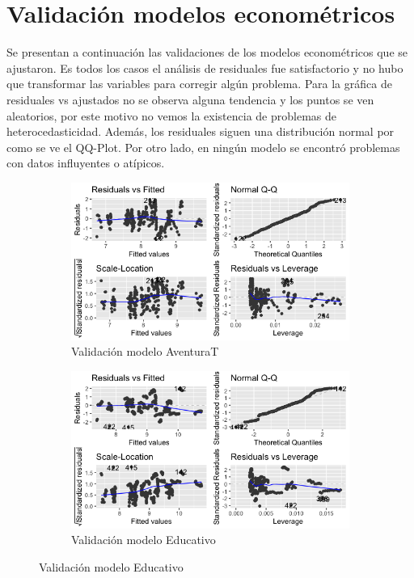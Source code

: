 \chapter{Validación modelos econométricos}

Se presentan a continuación las validaciones de los modelos econométricos que se ajustaron. Es todos los casos el análisis de residuales fue satisfactorio y no hubo que transformar las variables para corregir algún problema. Para la gráfica de residuales vs ajustados no se observa alguna tendencia y los puntos se ven aleatorios, por este motivo no vemos la existencia de problemas de heterocedasticidad. Además, los residuales siguen una distribución normal por como se ve el QQ-Plot. Por otro lado, en ningún modelo se encontró problemas con datos influyentes o atípicos. 

\newpage

\begin{figure}[H]
\centering
\label{fig:Validacion}
\begin{subfigure}
  \centering
  \caption{Validación modelo AventuraT}
  \includegraphics[width=.85\linewidth]{Imagenes/log_avent.png}
\end{subfigure}%
\begin{subfigure}
  \centering
  \caption{Validación modelo Educativo}
  \includegraphics[width=.85\linewidth]{Imagenes/log_educ.png}
\end{subfigure}
\end{figure}

